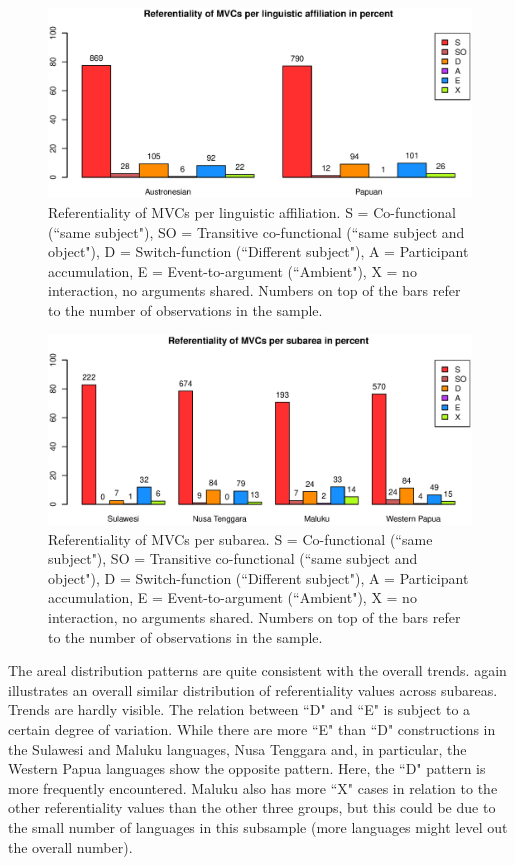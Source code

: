 \begin{figure}
\includegraphics[width=\columnwidth]{figures/Referentiality_Family.eps}
\caption[Referentiality of MVCs per linguistic affiliation]{Referentiality of MVCs per linguistic affiliation. S = Co-functional (``same subject"), SO = Transitive co-functional (``same subject and object"), D = Switch-function (``Different subject"), A = Participant accumulation, E = Event-to-argument (``Ambient"), X = no interaction, no arguments shared. Numbers on top of the bars refer to the number of observations in the sample.}\label{fig:ref-family}
\end{figure}
\begin{figure}
\includegraphics[width=\columnwidth]{figures/Referentiality_Group.eps}
\caption[Referentiality of MVCs per subarea]{Referentiality of MVCs per subarea. S = Co-functional (``same subject"), SO = Transitive co-functional (``same subject and object"), D = Switch-function (``Different subject"), A = Participant accumulation, E = Event-to-argument (``Ambient"), X = no interaction, no arguments shared. Numbers on top of the bars refer to the number of observations in the sample.}\label{fig:ref-group}
\end{figure}

The areal distribution patterns are quite consistent with the overall trends.  again illustrates an overall similar distribution of referentiality values across subareas. Trends are hardly visible. The relation between ``D" and ``E" is subject to a certain degree of variation. While there are more ``E" than ``D" constructions in the Sulawesi and Maluku languages, Nusa Tenggara and, in particular, the Western Papua languages show the opposite pattern. Here, the ``D" pattern is more frequently encountered. Maluku also has more ``X" cases in relation to the other referentiality values than the other three groups, but this could be due to the small number of languages in this subsample (more languages might level out the overall number).

